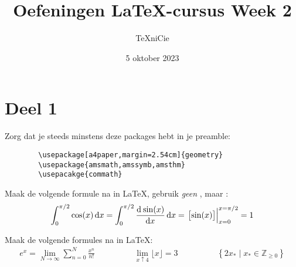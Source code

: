 \documentclass[a4paper]{article}
\title{\vspace{-65pt} Oefeningen \LaTeX-cursus Week 2}
\author{\TeX niCie}
\date{5 oktober 2023}
\begin{document}
\maketitle


\section{Deel 1}
Zorg dat je steeds minstens deze packages hebt in je preamble:
\begin{verbatim}
        \usepackage[a4paper,margin=2.54cm]{geometry}
        \usepackage{amsmath,amssymb,amsthm}
        \usepacakge{commath}
    \end{verbatim}
\bigskip


\begin{exercise}
    Maak de volgende formule na in \LaTeX, gebruik \emph{geen} \texttt{\frac}, maar \texttt{\dod}:
    \begin{align*}
        \int_{0}^{\pi/2}\cos(x)\dif x
        =
        \int_{0}^{\pi/2}\dod{\sin(x)}{x}\dif x
        =
        \left.\left[\sin(x)\right]\right|_{x=0}^{x=\pi/2}
        =
        1
    \end{align*}
\end{exercise}

\begin{exercise}
    Maak de volgende formules na in \LaTeX:
    \begin{align*}
        e^{x} = \lim_{N\to\infty}\sum_{n=0}^{N}\frac{x^n}{n!}
        \hspace{2cm}
        \lim_{x\uparrow 4}\lfloor x\rfloor = 3
        \hspace{2cm}
        \left\{2x_{*}\mid x_{*}\in \mathbb{Z}_{\geq 0}\right\}
    \end{align*}
\end{exercise}




\end{document}
